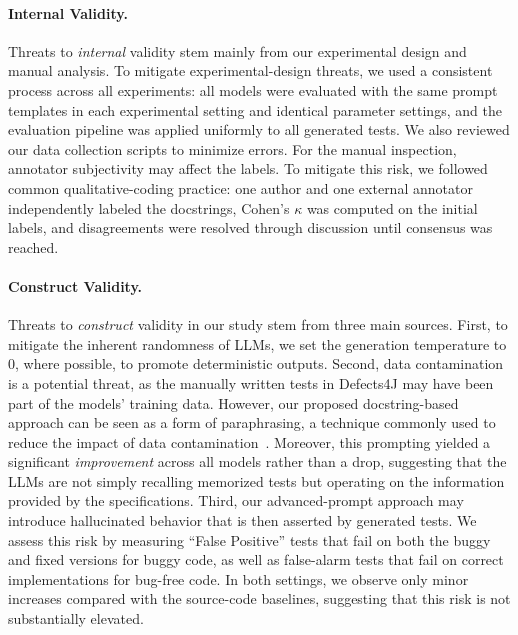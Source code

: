 \documentclass[acmsmall]{acmart}
\begin{document}
\paragraph{Internal Validity.}
Threats to \emph{internal} validity stem mainly from our experimental design and manual analysis. To mitigate experimental-design threats, we used a consistent process across all experiments: all models were evaluated with the same prompt templates in each experimental setting and identical parameter settings, and the evaluation pipeline was applied uniformly to all generated tests. We also reviewed our data collection scripts to minimize errors. For the manual inspection, annotator subjectivity may affect the labels. To mitigate this risk, we followed common qualitative-coding practice: one author and one external annotator independently labeled the docstrings, Cohen's $\kappa$ was computed on the initial labels, and disagreements were resolved through discussion until consensus was reached.

\paragraph{Construct Validity.}
Threats to \emph{construct} validity in our study stem from three main sources. First, to mitigate the inherent randomness of LLMs, we set the generation temperature to 0, where possible, to promote deterministic outputs. Second, data contamination is a potential threat, as the manually written tests in Defects4J may have been part of the models' training data. However, our proposed docstring-based approach can be seen as a form of paraphrasing, a technique commonly used to reduce the impact of data contamination~\cite{lu-etal-2024-mathgenie, yang2023rethinkingbenchmarkcontaminationlanguage, song2025llmcp}. Moreover, this prompting yielded a significant \emph{improvement} across all models rather than a drop, suggesting that the LLMs are not simply recalling memorized tests but operating on the information provided by the specifications. 
Third, our advanced-prompt approach may introduce hallucinated behavior that is then asserted by generated tests. We assess this risk by measuring ``False Positive'' tests that fail on both the buggy and fixed versions for buggy code, as well as false-alarm tests that fail on correct implementations for bug-free code. In both settings, we observe only minor increases compared with the source-code baselines, suggesting that this risk is not substantially elevated.

\end{document}
